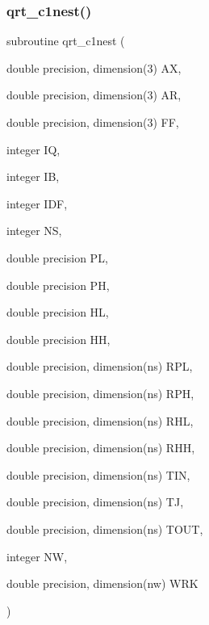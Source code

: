 \subsubsection{\texorpdfstring{qrt\+\_\+c1nest()}{qrt\_c1nest()}}
{\footnotesize\ttfamily subroutine qrt\+\_\+c1nest (\begin{DoxyParamCaption}\item[{double precision, dimension(3)}]{AX,  }\item[{double precision, dimension(3)}]{AR,  }\item[{double precision, dimension(3)}]{FF,  }\item[{integer}]{IQ,  }\item[{integer}]{IB,  }\item[{integer}]{I\+DF,  }\item[{integer}]{NS,  }\item[{double precision}]{PL,  }\item[{double precision}]{PH,  }\item[{double precision}]{HL,  }\item[{double precision}]{HH,  }\item[{double precision, dimension(ns)}]{R\+PL,  }\item[{double precision, dimension(ns)}]{R\+PH,  }\item[{double precision, dimension(ns)}]{R\+HL,  }\item[{double precision, dimension(ns)}]{R\+HH,  }\item[{double precision, dimension(ns)}]{T\+IN,  }\item[{double precision, dimension(ns)}]{TJ,  }\item[{double precision, dimension(ns)}]{T\+O\+UT,  }\item[{integer}]{NW,  }\item[{double precision, dimension(nw)}]{W\+RK }\end{DoxyParamCaption})}


